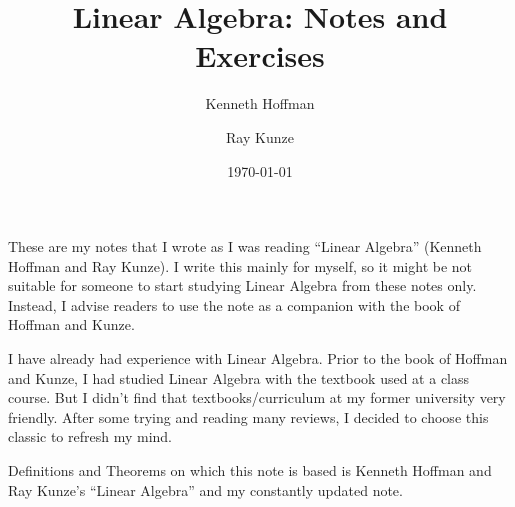 \documentclass{hoffman-and-kunze-linear-algebra}
\title{Linear Algebra: Notes and Exercises}
\author{Kenneth Hoffman\and Ray Kunze}
\date{\today}
\begin{document}
\maketitle

These are my notes that I wrote as I was reading ``Linear Algebra'' (Kenneth Hoffman and Ray Kunze). I write this mainly for myself, so it might be not suitable for someone to start studying Linear Algebra from these notes only. Instead, I advise readers to use the note as a companion with the book of Hoffman and Kunze.

I have already had experience with Linear Algebra. Prior to the book of Hoffman and Kunze, I had studied Linear Algebra with the textbook used at a class course. But I didn't find that textbooks/curriculum at my former university very friendly. After some trying and reading many reviews, I decided to choose this classic to refresh my mind.

Definitions and Theorems on which this note is based is Kenneth Hoffman and Ray Kunze's ``Linear Algebra'' and my constantly updated note.

\tableofcontents











\end{document}
